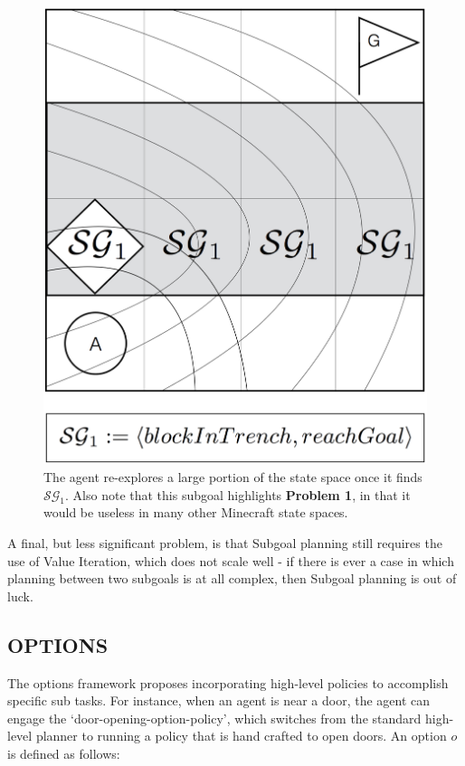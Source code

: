 \documentclass[]{article}
\begin{document}
\begin{figure}
\centering
\includegraphics[scale=0.22]{figures/bridgeworld_sg.png}
\caption{The agent re-explores a large portion of the state space 
once it finds $\mathcal{SG}_1$. Also note that this subgoal 
highlights {\bf Problem 1}, in that it would be useless in many other Minecraft state spaces.}
\label{fig:bwsg}
\end{figure}


A final, but less significant problem, is that Subgoal planning still 
requires the use of Value Iteration, which does not scale well - if 
there is ever a case in which planning between two subgoals is 
at all complex, then Subgoal planning is out of luck.

\subsection{OPTIONS}

The options framework proposes incorporating high-level policies to 
accomplish specific sub tasks. For instance, when an agent is near 
a door, the agent can engage the `door-opening-option-policy', which 
switches from the standard high-level planner to running a policy 
that is hand crafted to open doors. An option $o$ is defined as follows:
\end{document}
